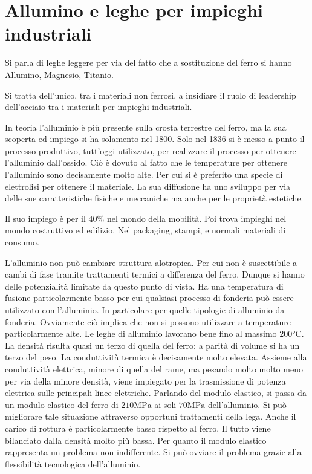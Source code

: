 \chapter{Allumino e leghe per impieghi industriali}\label{chp:Alluminio}
Si parla di leghe leggere per via del fatto che a sostituzione del ferro si hanno Allumino, Magnesio, Titanio.

Si tratta dell'unico, tra i materiali non ferrosi, a insidiare il ruolo di leadership dell'acciaio tra i materiali per impieghi industriali.

In teoria l'alluminio è più presente sulla crosta terrestre del ferro, ma la sua scoperta ed impiego si ha solamento nel 1800.
Solo nel 1836 si è messo a punto il processo produttivo, tutt'oggi utilizzato,  per realizzare il processo per ottenere l'alluminio dall'ossido.
Ciò è dovuto al fatto che le temperature per ottenere l'alluminio sono decisamente molto alte. Per cui si è preferito una specie di elettrolisi per ottenere il materiale.
La sua diffusione ha uno sviluppo per via delle sue caratteristiche fisiche e meccaniche ma anche per le proprietà estetiche.

Il suo impiego è per il $40\%$ nel mondo della mobilità. Poi trova impieghi nel mondo costruttivo ed edilizio. Nel packaging, stampi, e normali materiali di consumo.

L'alluminio non può cambiare struttura alotropica. Per cui non è suscettibile a cambi di fase tramite trattamenti termici a differenza del ferro. Dunque si hanno delle potenzialità limitate da questo punto di vista.  
Ha una temperatura di fusione particolarmente basso per cui qualsiasi processo di fonderia può essere utilizzato con l'alluminio. In particolare per quelle tipologie di alluminio da fonderia. Ovviamente ciò implica che non si possono utilizzare a temperature particolarmente alte.
Le leghe di alluminio lavorano bene fino al massimo $200\unit{\celsius}$.
La densità risulta quasi un terzo di quella del ferro: a parità di volume si ha un terzo del peso.
La conduttività termica è decisamente molto elevata. Assieme alla conduttività elettrica, minore di quella del rame, ma pesando molto molto meno per via della minore densità, viene impiegato per la trasmissione di potenza elettrica sulle principali linee elettriche.
Parlando del modulo elastico, si passa da un modulo elastico del ferro di $210\unit{\MPa}$ ai soli $70\unit{\MPa}$ dell'alluminio. Si può migliorare tale situazione attraverso opportuni trattamenti della lega.
Anche il carico di rottura è particolarmente basso rispetto al ferro.
Il tutto viene bilanciato dalla densità molto più bassa.
Per quanto il modulo elastico rappresenta un problema non indifferente. Si può ovviare il problema grazie alla flessibilità tecnologica dell'alluminio.

